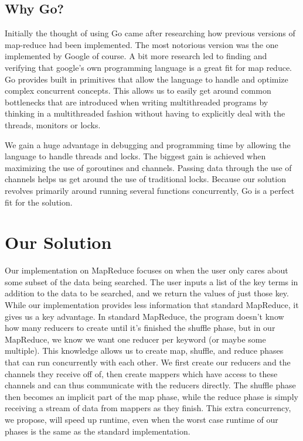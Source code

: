 \documentclass[report]{IEEEtran}
\begin{document}
\subsection {Why Go?}
Initially the thought of using Go came after researching how previous versions of map-reduce had been implemented. The most notorious version was the one implemented by Google of course. A bit more research led to finding and verifying that google's own programming language is a great fit for map reduce. Go provides built in primitives that allow the language to handle and optimize complex concurrent concepts. This allows us to easily get around common bottlenecks that are introduced when writing multithreaded programs by thinking in a multithreaded fashion without having to explicitly deal with the threads, monitors or locks.

We gain a huge advantage in debugging and programming time by allowing the language to handle threads and locks. The biggest gain is achieved when maximizing the use of goroutines and channels. Passing data through the use of channels helps us get around the use of traditional locks. Because our solution revolves primarily around running several functions concurrently, Go is a perfect fit for the solution. 

\section{Our Solution}

Our implementation on MapReduce focuses on when the user only cares about some subset of the data being searched. The user inputs a list of the key terms in addition to the data to be searched, and we return the values of just those key. While our implementation provides less information that standard MapReduce, it gives us a key advantage. In standard MapReduce, the program doesn't know how many reducers to create until it's finished the shuffle phase, but in our MapReduce, we know we want one reducer per keyword (or maybe some multiple). This knowledge allows us to create map, shuffle, and reduce phases that can run concurrently with each other. We first create our reducers and the channels they receive off of, then create mappers which have access to these channels and can thus communicate with the reducers directly. The shuffle phase then becomes an implicit part of the map phase, while the reduce phase is simply receiving a stream of data from mappers as they finish. This extra concurrency, we propose, will speed up runtime, even when the worst case runtime of our phases is the same as the standard implementation. 
\end{document}
